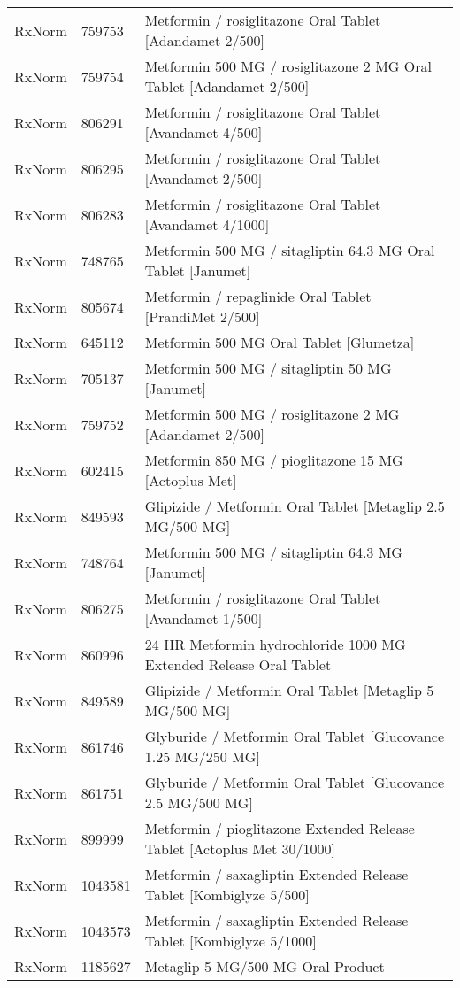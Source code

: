 \begin{longtable}{p{}p{}p{}}
  RxNorm & 759753 & Metformin / rosiglitazone Oral Tablet [Adandamet 2/500] \\ 
  RxNorm & 759754 & Metformin 500 MG / rosiglitazone 2 MG Oral Tablet [Adandamet 2/500] \\ 
  RxNorm & 806291 & Metformin / rosiglitazone Oral Tablet [Avandamet 4/500] \\ 
  RxNorm & 806295 & Metformin / rosiglitazone Oral Tablet [Avandamet 2/500] \\ 
  RxNorm & 806283 & Metformin / rosiglitazone Oral Tablet [Avandamet 4/1000] \\ 
  RxNorm & 748765 & Metformin 500 MG / sitagliptin 64.3 MG Oral Tablet [Janumet] \\ 
  RxNorm & 805674 & Metformin / repaglinide Oral Tablet [PrandiMet 2/500] \\ 
  RxNorm & 645112 & Metformin 500 MG Oral Tablet [Glumetza] \\ 
  RxNorm & 705137 & Metformin 500 MG / sitagliptin 50 MG [Janumet] \\ 
  RxNorm & 759752 & Metformin 500 MG / rosiglitazone 2 MG [Adandamet 2/500] \\ 
  RxNorm & 602415 & Metformin 850 MG / pioglitazone 15 MG [Actoplus Met] \\ 
  RxNorm & 849593 & Glipizide / Metformin Oral Tablet [Metaglip 2.5 MG/500 MG] \\ 
  RxNorm & 748764 & Metformin 500 MG / sitagliptin 64.3 MG [Janumet] \\ 
  RxNorm & 806275 & Metformin / rosiglitazone Oral Tablet [Avandamet 1/500] \\ 
  RxNorm & 860996 & 24 HR Metformin hydrochloride 1000 MG Extended Release Oral Tablet \\ 
  RxNorm & 849589 & Glipizide / Metformin Oral Tablet [Metaglip 5 MG/500 MG] \\ 
  RxNorm & 861746 & Glyburide / Metformin Oral Tablet [Glucovance 1.25 MG/250 MG] \\ 
  RxNorm & 861751 & Glyburide / Metformin Oral Tablet [Glucovance 2.5 MG/500 MG] \\ 
  RxNorm & 899999 & Metformin / pioglitazone Extended Release Tablet [Actoplus Met 30/1000] \\ 
  RxNorm & 1043581 & Metformin / saxagliptin Extended Release Tablet [Kombiglyze 5/500] \\ 
  RxNorm & 1043573 & Metformin / saxagliptin Extended Release Tablet [Kombiglyze 5/1000] \\ 
  RxNorm & 1185627 & Metaglip 5 MG/500 MG Oral Product \\ 

\end{longtable}
